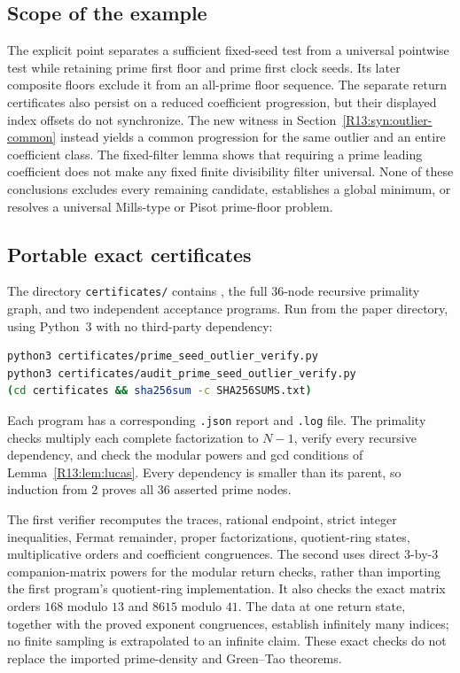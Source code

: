 \documentclass[11pt,a4paper]{article}
\theoremstyle{definition}\newtheorem{definition}[theorem]{Definition}
\theoremstyle{remark}\newtheorem{remark}[theorem]{Remark}
\begin{document}
\subsection{Scope of the example}

The explicit point separates a sufficient fixed-seed test from a
universal pointwise test while retaining prime first floor and
prime first clock seeds.
Its later composite floors exclude it from an all-prime floor
sequence. The separate return certificates also persist on a
reduced coefficient progression, but their displayed index offsets
do not synchronize. The new witness in Section~\ref{R13:syn:outlier-common} instead yields a common progression for the same outlier and an entire coefficient class.
The fixed-filter lemma shows that requiring a prime leading
coefficient does not make any fixed finite divisibility filter universal.
None of these conclusions excludes every remaining candidate,
establishes a global minimum, or resolves a universal Mills-type
or Pisot prime-floor problem.


\subsection{Portable exact certificates}

The directory \texttt{certificates/} contains
, the full $36$-node recursive
primality graph, and two independent acceptance programs.
Run from the paper directory, using Python~3 with no third-party dependency:
\begin{lstlisting}[language=bash]
python3 certificates/prime_seed_outlier_verify.py
python3 certificates/audit_prime_seed_outlier_verify.py
(cd certificates && sha256sum -c SHA256SUMS.txt)
\end{lstlisting}
Each program has a corresponding \texttt{.json} report and
\texttt{.log} file.
The primality checks multiply each complete factorization to $N-1$,
verify every recursive dependency, and check the modular powers and
gcd conditions of Lemma~\ref{R13:lem:lucas}.
Every dependency is smaller than its parent, so induction from $2$
proves all $36$ asserted prime nodes.

The first verifier recomputes the traces, rational endpoint,
strict integer inequalities, Fermat remainder, proper factorizations,
quotient-ring states, multiplicative orders and coefficient congruences.
The second uses direct $3$-by-$3$ companion-matrix powers for the
modular return checks, rather than importing the first program's
quotient-ring implementation. It also checks the exact matrix orders
$168$ modulo $13$ and $8615$ modulo $41$.
The data at one return state, together with the proved exponent
congruences, establish infinitely many indices; no finite sampling
is extrapolated to an infinite claim.
These exact checks do not replace the imported prime-density and
Green--Tao theorems.
\end{document}
